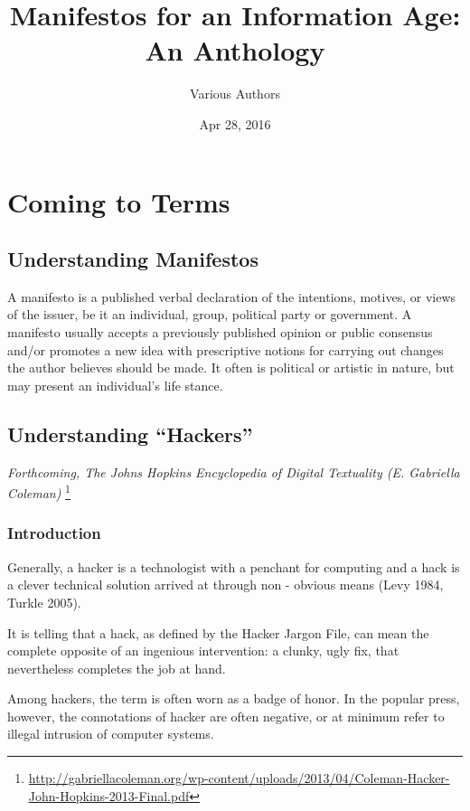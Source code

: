 \documentclass[letterpaper,12pt,english]{sphinxmanual}
\title{Manifestos for an Information Age: An Anthology}
\date{Apr 28, 2016}
\author{Various Authors}
\begin{document}
\maketitle
\tableofcontents
{}\label{index::doc}



\chapter{Coming to Terms}
\label{preface::doc}\label{preface:coming-to-terms}\label{preface:manifestos-for-the-information-age-an-anthology}

\section{Understanding Manifestos}
\label{preface:understanding-manifestos}
A manifesto is a published verbal declaration of the intentions, motives, or views of the issuer, be it an individual, group, political party or government. A manifesto usually accepts a previously published opinion or public consensus and/or promotes a new idea with prescriptive notions for carrying out changes the author believes should be made. It often is political or artistic in nature, but may present an individual's life stance.


\section{Understanding ``Hackers''}
\label{preface:understanding-hackers}
\emph{Forthcoming, The Johns Hopkins Encyclopedia of Digital Textuality (E. Gabriella Coleman)} \footnote[1]{\sphinxAtStartFootnote%
\url{http://gabriellacoleman.org/wp-content/uploads/2013/04/Coleman-Hacker-John-Hopkins-2013-Final.pdf}
}


\subsection{Introduction}
\label{preface:introduction}
Generally,
a
hacker
is
a
technologist
with
a
penchant
for
computing
and
a
hack
is
a
clever
technical
solution
arrived
at
through
non
-
obvious
means (Levy
1984,
Turkle
2005).

It
is
telling
that
a
hack,
as
defined
by
the
Hacker
Jargon
File, can mean the complete opposite of an ingenious intervention: a clunky, ugly fix,
that nevertheless completes the job at hand.

Among hackers, the term is often worn as a badge of honor. In the popular press, however, the
connotations
of
hacker
are
often
negative,
or
at
minimum
refer
to
illegal
intrusion
of
computer
systems.
\end{document}
